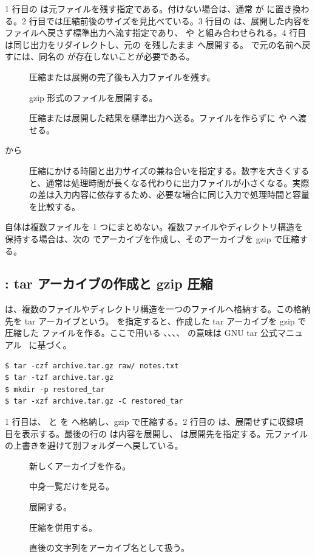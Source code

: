 1 行目の  は元ファイルを残す指定である。付けない場合は、通常  が  に置き換わる。2 行目では圧縮前後のサイズを見比べている。3 行目の  は、展開した内容をファイルへ戻さず標準出力へ流す指定であり、 や  と組み合わせられる。4 行目は同じ出力をリダイレクトし、元の  を残したまま  へ展開する。 で元の名前へ戻すには、同名の  が存在しないことが必要である。

\begin{description}
\item[] 圧縮または展開の完了後も入力ファイルを残す。
\item[] gzip 形式のファイルを展開する。
\item[] 圧縮または展開した結果を標準出力へ送る。ファイルを作らずに  や  へ渡せる。
\item[ から ] 圧縮にかける時間と出力サイズの兼ね合いを指定する。数字を大きくすると、通常は処理時間が長くなる代わりに出力ファイルが小さくなる。実際の差は入力内容に依存するため、必要な場合に同じ入力で処理時間と容量を比較する。
\end{description}

 自体は複数ファイルを 1 つにまとめない。複数ファイルやディレクトリ構造を保持する場合は、次の  でアーカイブを作成し、そのアーカイブを gzip で圧縮する。

\subsection{: tar アーカイブの作成と gzip 圧縮}

 は、複数のファイルやディレクトリ構造を一つのファイルへ格納する。この格納先を tar アーカイブという。 を指定すると、作成した tar アーカイブを gzip で圧縮した  ファイルを作る。ここで用いる 、、、、 の意味は GNU tar 公式マニュアル~\cite{gnu_tar_manual} に基づく。

\begin{lstlisting}[numbers=none, xleftmargin=2\zw]
$ tar -czf archive.tar.gz raw/ notes.txt
$ tar -tzf archive.tar.gz
$ mkdir -p restored_tar
$ tar -xzf archive.tar.gz -C restored_tar
\end{lstlisting}

1 行目は、 と  を  へ格納し、gzip で圧縮する。2 行目の  は、展開せずに収録項目を表示する。最後の行の  は内容を展開し、 は展開先を指定する。元ファイルの上書きを避けて別フォルダーへ戻している。
\begin{description}
\item[] 新しくアーカイブを作る。
\item[] 中身一覧だけを見る。
\item[] 展開する。
\item[]  圧縮を併用する。
\item[] 直後の文字列をアーカイブ名として扱う。
\end{description}

